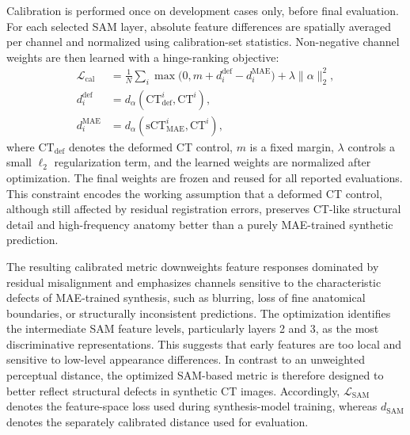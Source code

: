 \documentclass[lettersize,journal]{IEEEtran}
\begin{document}
Calibration is performed once on development cases only, before final evaluation. For each selected SAM layer, absolute feature differences are spatially averaged per channel and normalized using calibration-set statistics. Non-negative channel weights are then learned with a hinge-ranking objective:
\begin{equation}
\begin{aligned}
\mathcal{L}_{\mathrm{cal}}
&= \frac{1}{N}\sum_i
\max\bigl(0, m + d_i^{\mathrm{def}} - d_i^{\mathrm{MAE}}\bigr)
+ \lambda\|\alpha\|_2^2, \\
d_i^{\mathrm{def}}
&= d_{\alpha}(\mathrm{CT}_{\mathrm{def}}^i,\mathrm{CT}^i), \\
d_i^{\mathrm{MAE}}
&= d_{\alpha}(\mathrm{sCT}_{\mathrm{MAE}}^i,\mathrm{CT}^i),
\end{aligned}
\end{equation}
where $\mathrm{CT}_{\mathrm{def}}$ denotes the deformed CT control, $m$ is a fixed margin, $\lambda$ controls a small $\ell_2$ regularization term, and the learned weights are normalized after optimization. The final weights are frozen and reused for all reported evaluations. This constraint encodes the working assumption that a deformed CT control, although still affected by residual registration errors, preserves CT-like structural detail and high-frequency anatomy better than a purely MAE-trained synthetic prediction.

The resulting calibrated metric downweights feature responses dominated by residual misalignment and emphasizes channels sensitive to the characteristic defects of MAE-trained synthesis, such as blurring, loss of fine anatomical boundaries, or structurally inconsistent predictions. The optimization identifies the intermediate SAM feature levels, particularly layers 2 and 3, as the most discriminative representations. This suggests that early features are too local and sensitive to low-level appearance differences. In contrast to an unweighted perceptual distance, the optimized SAM-based metric is therefore designed to better reflect structural defects in synthetic CT images.
Accordingly, $\mathcal{L}_{\mathrm{SAM}}$ denotes the feature-space loss used during synthesis-model training, whereas $d_{\mathrm{SAM}}$ denotes the separately calibrated distance used for evaluation.
\end{document}
